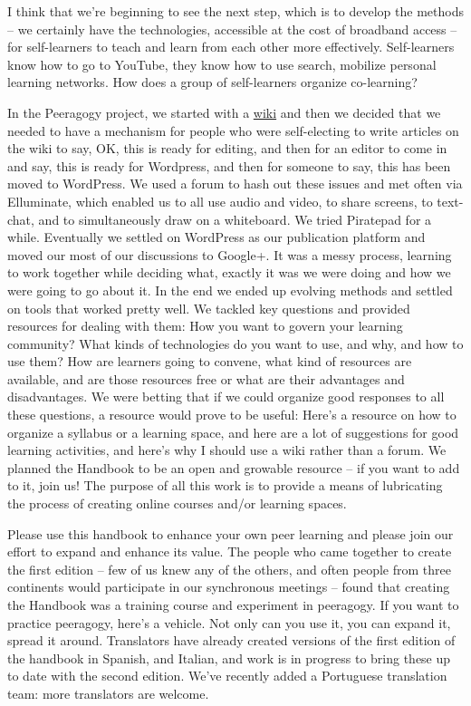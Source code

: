 I think that we're beginning to see the next step, which is to develop
the methods -- we certainly have the technologies, accessible at the
cost of broadband access -- for self-learners to teach and learn from
each other more effectively. Self-learners know how to go to YouTube,
they know how to use search, mobilize personal learning networks. How
does a group of self-learners organize co-learning?

In the Peeragogy project, we started with a
\href{http://socialmediaclassroom.com/host/peeragogy/}{wiki} and then we
decided that we needed to have a mechanism for people who were
self-electing to write articles on the wiki to say, OK, this is ready
for editing, and then for an editor to come in and say, this is ready
for Wordpress, and then for someone to say, this has been moved to
WordPress. We used a forum to hash out these issues and met often via
Elluminate, which enabled us to all use audio and video, to share
screens, to text-chat, and to simultaneously draw on a whiteboard. We
tried Piratepad for a while. Eventually we settled on WordPress as our
publication platform and moved our most of our discussions to Google+.
It was a messy process, learning to work together while deciding what,
exactly it was we were doing and how we were going to go about it. In
the end we ended up evolving methods and settled on tools that worked
pretty well. We tackled key questions and provided resources for dealing
with them: How you want to govern your learning community? What kinds of
technologies do you want to use, and why, and how to use them? How are
learners going to convene, what kind of resources are available, and are
those resources free or what are their advantages and disadvantages. We
were betting that if we could organize good responses to all these
questions, a resource would prove to be useful: Here's a resource on how
to organize a syllabus or a learning space, and here are a lot of
suggestions for good learning activities, and here's why I should use a
wiki rather than a forum. We planned the Handbook to be an open and
growable resource -- if you want to add to it, join us! The purpose of
all this work is to provide a means of lubricating the process of
creating online courses and/or learning spaces.

Please use this handbook to enhance your own peer learning and please
join our effort to expand and enhance its value. The people who came
together to create the first edition -- few of us knew any of the
others, and often people from three continents would participate in our
synchronous meetings -- found that creating the Handbook was a training
course and experiment in peeragogy. If you want to practice peeragogy,
here's a vehicle. Not only can you use it, you can expand it, spread it
around. Translators have already created versions of the first edition
of the handbook in Spanish, and Italian, and work is in progress to
bring these up to date with the second edition. We've recently added a
Portuguese translation team: more translators are welcome.

